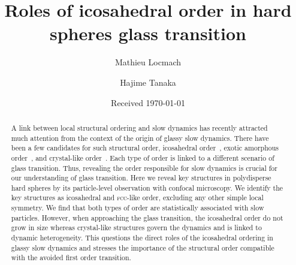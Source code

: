 


\title{Roles of icosahedral order in hard spheres glass transition} 


\author{Mathieu Locmach} 

\author{Hajime Tanaka}

\date{Received \today}

\begin{abstract}
A link between local structural ordering and slow dynamics has recently attracted much attention from the context of the origin of glassy slow dynamics. There have been a few candidates for such structural order, icosahedral order~\cite{steinhardt1983boo,tarjus2005fba}, exotic amorphous order~\cite{xia2000flp}, and crystal-like order~\cite{tanaka2010critical}. Each type of order is linked to a different scenario of glass transition. Thus, revealing the order responsible for slow dynamics is crucial for our understanding of glass transition. Here we reveal key structures in polydisperse hard spheres by its particle-level observation with confocal microscopy. We identify the key structures as icosahedral and \textsc{fcc}-like order, excluding any other simple local symmetry. We find that both types of order are statistically associated with slow particles. However, when approaching the glass transition, the icosahedral order do not grow in size whereas crystal-like structures govern the dynamics and is linked to dynamic heterogeneity. This questions the direct roles of the icosahedral ordering in glassy slow dynamics and stresses the importance of the structural order compatible with the avoided first order transition.
\end{abstract}
\maketitle



